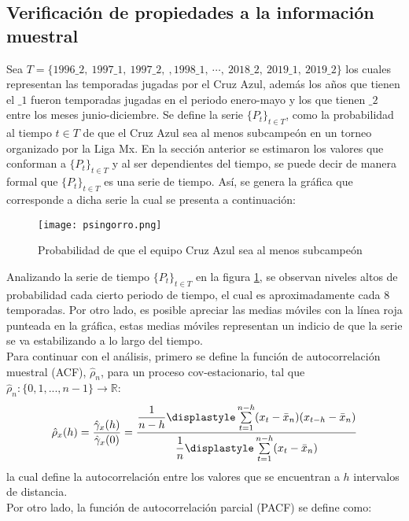 \documentclass{article}
\theoremstyle{remark}
\begin{document}
\subsection{Verificación de propiedades a la información muestral}
Sea $T= \{1996\_2, \ 1997\_1, \ 1997\_2, \ ,1998\_1, \ \cdots, \  2018\_2,\ 2019\_1, \ 2019\_2\}$ los cuales representan las temporadas jugadas por el Cruz Azul, además los años que tienen el $\_1$ fueron temporadas jugadas en el periodo enero-mayo y los que tienen $\_2$ entre los meses junio-diciembre. Se define la serie $\{P_t\}_{t\in T}$, como la probabilidad al tiempo $t\in T$ de que el Cruz Azul sea al menos subcampeón en un torneo organizado por la Liga Mx. En la sección anterior se estimaron los valores que conforman a  $\{P_t\}_{t\in T}$ y al ser dependientes del tiempo, se puede decir de manera formal que  $\{P_t\}_{t\in T}$ es una serie de tiempo. Así, se genera la gráfica que corresponde a dicha serie  la cual se presenta a continuación:

\begin{figure}[H]
\centering
\texttt{[image: psingorro.png]}
\caption{Probabilidad de que el equipo Cruz Azul sea al menos subcampeón }
\label{prob_cruzazul}
\end{figure} 

Analizando la serie de tiempo $\{P_t\}_{t \in T}$ en la figura \ref{prob_cruzazul}, se observan niveles altos de  probabilidad cada cierto periodo de tiempo, el cual es aproximadamente cada 8 temporadas. Por otro lado, es posible apreciar las medias móviles con la línea roja punteada en la gráfica, estas medias móviles representan un indicio de que la serie se va estabilizando a lo largo del tiempo.\\

Para continuar con el análisis, primero se define la función de autocorrelación muestral (ACF), $\hat{\rho}_{n}$,  para un proceso cov-estacionario, tal que  $\hat{\rho}_{n}:\{0,1,...,n-1\} \rightarrow \mathbb{R}$:
\begin{equation}
\label{autmuest}
    \hat{\rho}_{x}(h)=\dfrac{\hat{\gamma}_{x}(h)}{\hat{\gamma}_{x}(0)}=\dfrac{\dfrac{1}{n-h}\displastyle\sum\limits_{t=1}^{n-h}(x_{t}-\bar{x}_{n})(x_{t-h}-\bar{x}_{n})}{\dfrac{1}{n}\displastyle\sum\limits_{t=1}^{n-h}(x_{t}-\bar{x}_{n})}
\end{equation}
la cual define la autocorrelación entre los valores que se encuentran a $h$ intervalos de distancia.\\

Por otro lado, la función de autocorrelación parcial (PACF) se define como:
\end{document}
